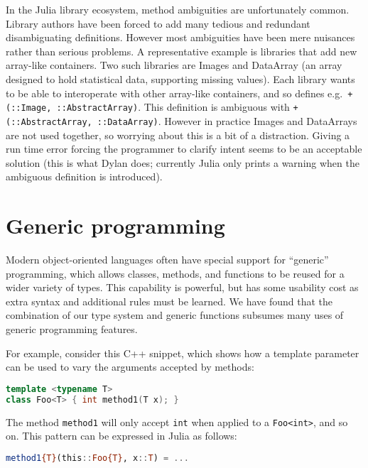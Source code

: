 In the Julia library ecosystem, method ambiguities are unfortunately
common.
Library authors have been forced to add many tedious and redundant
disambiguating definitions.
However most ambiguities have been mere nuisances rather than serious
problems.
A representative example is libraries that add new array-like
containers.
Two such libraries are Images and DataArray (an array designed to
hold statistical data, supporting missing values).
Each library wants to be able to interoperate with other array-like
containers, and so defines e.g.\ \texttt{+(::Image, ::AbstractArray)}.
This definition is ambiguous with \texttt{+(::AbstractArray, ::DataArray)}.
However in practice Images and DataArrays are not used together, so
worrying about this is a bit of a distraction.
Giving a run time error forcing the programmer to clarify intent
seems to be an acceptable solution (this is what Dylan does;
currently Julia only prints a warning when the ambiguous definition
is introduced).

\section{Generic programming}

Modern object-oriented languages often have special support for ``generic''
programming, which allows classes, methods, and functions to be reused
for a wider variety of types.
This capability is powerful, but has some usability cost as extra
syntax and additional rules must be learned.
We have found that the combination of our type system and generic functions
subsumes many uses of generic programming features.

For example, consider this C++ snippet, which shows how a template
parameter can be used to vary the arguments accepted by methods:

\begin{singlespace}
\begin{lstlisting}[language=c++,style=ttcode]
template <typename T>
class Foo<T> { int method1(T x); }
\end{lstlisting}
\end{singlespace}

\noindent
The method \texttt{method1} will only accept \texttt{int} when applied to
a \texttt{Foo<int>}, and so on.
This pattern can be expressed in Julia as follows:

\begin{singlespace}
\begin{lstlisting}[language=julia]
method1{T}(this::Foo{T}, x::T) = ...
\end{lstlisting}
\end{singlespace}

